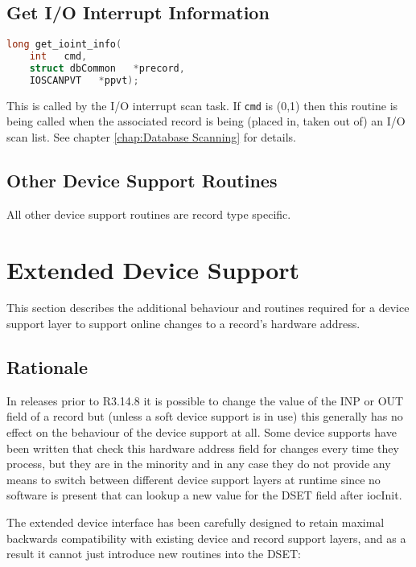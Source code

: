 \subsection{Get I/O Interrupt Information}

\begin{lstlisting}[language=C]
long get_ioint_info(
    int   cmd,
    struct dbCommon   *precord,
    IOSCANPVT   *ppvt);
\end{lstlisting}

This is called by the I/O interrupt scan task.
If \verb|cmd| is (0,1) then this routine is being called when the associated record is being (placed in, taken out of) an I/O scan list.
See chapter \ref{chap:Database Scanning} for details.

\subsection{Other Device Support Routines}

All other device support routines are record type specific.

\section{Extended Device Support}
\label{sec:Extended Device Support}

This section describes the additional behaviour and routines required for a device support layer to support online changes to a record's hardware address.

\subsection{Rationale}

In releases prior to R3.14.8 it is possible to change the value of the INP or OUT field of a record but (unless a soft device support is in use) this generally has no effect on the behaviour of the device support at all.
Some device supports have been written that check this hardware address field for changes every time they process, but they are in the minority and in 
any case they do not provide any means to switch between different device support layers at runtime since no software is present that can lookup a new value for the DSET field after iocInit.

The extended device interface has been carefully designed to retain maximal backwards compatibility with existing device and record support layers, and as a result it cannot just introduce new routines into the DSET:

